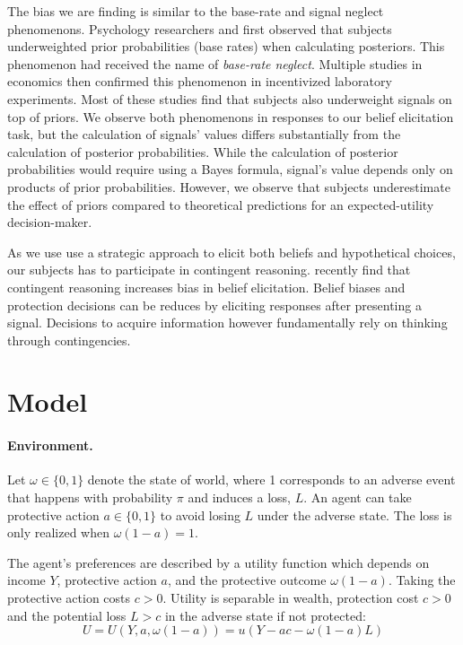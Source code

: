 \documentclass[12pt,a4paper]{article}
\begin{document}
The bias we are finding is similar to the base-rate and signal neglect phenomenons. Psychology researchers \citet{hammerton_case_1973} and \citet{kahneman_psychology_1973} first observed that subjects underweighted prior probabilities (base rates) when calculating posteriors. This phenomenon had received the name of \textit{base-rate neglect}. Multiple studies in economics then confirmed \citep*{grether_testing_1992, holt_update_2009} this phenomenon in incentivized laboratory experiments. Most of these studies find that subjects also underweight signals on top of priors.  We observe both phenomenons in responses to our belief elicitation task, but the calculation of signals' values differs substantially from the calculation of posterior probabilities. While the calculation of posterior probabilities would require using a Bayes formula, signal's value depends only on products of prior probabilities. However, we observe that subjects underestimate the effect of priors compared to theoretical predictions for an expected-utility decision-maker.

As we use use a strategic approach to elicit both beliefs and hypothetical choices, our subjects has to participate in contingent reasoning. \citet{aina_contingent_2023} recently find that contingent reasoning increases bias in belief elicitation. Belief biases and protection decisions can be reduces by eliciting responses after presenting a signal. Decisions to acquire information however fundamentally rely on thinking through contingencies.

\vspace{20pt}
\section{Model}
\paragraph{Environment.} Let $\omega \in \{0,1\}$ denote the state of world, where 1 corresponds to an adverse event that happens with probability $\pi$ and induces a loss, $L$. An agent can take protective action $a\in\{0,1\}$ to avoid losing $L$ under the adverse state. The loss is only realized when $\omega(1-a)=1$.

The agent's preferences are described by a utility function which depends on income $Y$, protective action $a$, and the protective outcome $\omega(1-a)$. Taking the protective action costs $c>0$. Utility is separable in wealth, protection cost $c>0$ and the potential loss $L>c$ in the adverse state if not protected:
\[
U=U(Y,a,\omega(1-a))=u(Y-ac-\omega(1-a)L)
\]
\end{document}
